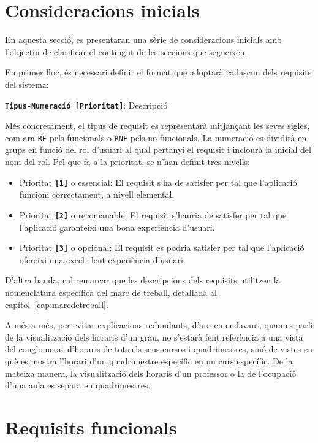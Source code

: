 \documentclass[a4paper,12pt]{ThesisStyle}
\begin{document}
\section{Consideracions inicials}
\label{sec:consideracions_inicials}

En aquesta secció, es presentaran una sèrie de consideracions inicials amb l'objectiu de clarificar el contingut de les seccions que segueixen.

En primer lloc, és necessari definir el format que adoptarà cadascun dels requisits del sistema:
\\[8pt]
\centerline{\texttt{\textbf{Tipus-Numeració [Prioritat]}}: Descripció}

Més concretament, el tipus de requisit es representarà mitjançant les seves sigles, com ara \texttt{RF} pels funcionals o \texttt{RNF} pels no funcionals. La numeració es dividirà en grups en funció del rol d'usuari al qual pertanyi el requisit i inclourà la inicial del nom del rol. Pel que fa a la prioritat, se n'han definit tres nivells:
\begin{itemize}
  \item Prioritat \texttt{\textbf{[1]}} o essencial: El requisit s'ha de satisfer per tal que l'aplicació funcioni correctament, a nivell elemental.
  \item Prioritat \texttt{\textbf{[2]}} o recomanable: El requisit s'hauria de satisfer per tal que l'aplicació garanteixi una bona experiència d'usuari.
  \item Prioritat \texttt{\textbf{[3]}} o opcional: El requisit es podria satisfer per tal que l'aplicació ofereixi una excel·lent experiència d'usuari.
\end{itemize}

D'altra banda, cal remarcar que les descripcions dels requisits utilitzen la nomenclatura específica del marc de treball, detallada al capítol~\ref{cap:marcdetreball}.

A més a més, per evitar explicacions redundants, d'ara en endavant, quan es parli de la visualització dels horaris d'un grau, no s'estarà fent referència a una vista del conglomerat d'horaris de tots els seus cursos i quadrimestres, sinó de vistes en què es mostra l'horari d'un quadrimestre específic en un curs específic. De la mateixa manera, la visualització dels horaris d'un professor o la de l'ocupació d'una aula es separa en quadrimestres.

\section{Requisits funcionals}
\label{sec:requisits_funcionals}
\end{document}
